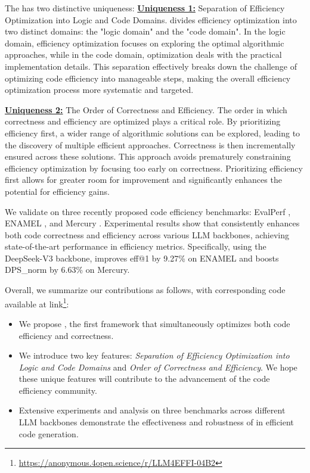 The \tool has two distinctive uniqueness:
\noindent\textbf{\underline{Uniqueness 1:}} Separation of Efficiency Optimization into Logic and Code Domains. \tool divides efficiency optimization into two distinct domains: the "logic domain" and the "code domain". In the logic domain, efficiency optimization focuses on exploring the optimal algorithmic approaches, while in the code domain, optimization deals with the practical implementation details. This separation effectively breaks down the challenge of optimizing code efficiency into manageable steps, making the overall efficiency optimization process more systematic and targeted.

\noindent\textbf{\underline{Uniqueness 2:}} The Order of Correctness and Efficiency. The order in which correctness and efficiency are optimized plays a critical role. By prioritizing efficiency first, a wider range of algorithmic solutions can be explored, leading to the discovery of multiple efficient approaches. Correctness is then incrementally ensured across these solutions. This approach avoids prematurely constraining efficiency optimization by focusing too early on correctness. Prioritizing efficiency first allows for greater room for improvement and significantly enhances the potential for efficiency gains.

We validate \tool on three recently proposed code efficiency benchmarks: EvalPerf \cite{liu2024evaluatinglanguagemodelsefficient}, ENAMEL \cite{qiu2024efficientllmgeneratedcoderigorous}, and Mercury \cite{du2024mercury}. Experimental results show that \tool consistently enhances both code correctness and efficiency across various LLM backbones, achieving state-of-the-art performance in efficiency metrics. Specifically, using the DeepSeek-V3 backbone, \tool improves eff@1 by 9.27\% on ENAMEL and boosts DPS\_norm by 6.63\% on Mercury.

Overall, we summarize our contributions as follows, with corresponding code available at link\footnote{\url{https://anonymous.4open.science/r/LLM4EFFI-04B2}}:
\begin{itemize}[itemsep=2pt,topsep=0pt,parsep=0pt]
\item We propose \tool, the first framework that simultaneously optimizes both code efficiency and correctness.
\item We introduce two key features: \textit{Separation of Efficiency Optimization into Logic and Code Domains} and \textit{Order of Correctness and Efficiency}. We hope these unique features will contribute to the advancement of the code efficiency community.
\item Extensive experiments and analysis on three benchmarks across different LLM backbones demonstrate the effectiveness and robustness of \tool in efficient code generation.
\end{itemize}